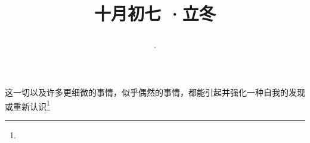 \title{\date[d=7,m=11,y=2024][year:cn-y,年,month:cn,day:cn,日,·,weekday]·十月初七 ·立冬}
这一切以及许多更细微的事情，似乎偶然的事情，都能引起并强化一种自我的发现或重新认识\footnote{ }


